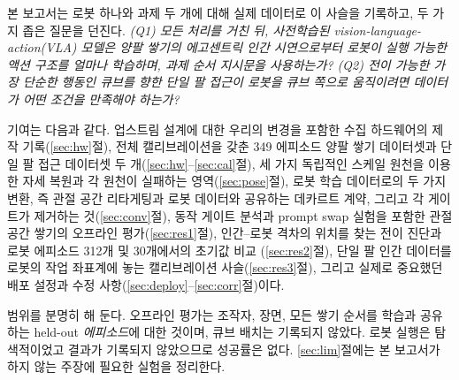 \documentclass[conference,10pt]{IEEEtran}
\begin{document}
본 보고서는 로봇 하나와 과제 두 개에 대해 실제 데이터로 이 사슬을 기록하고, 두 가지 좁은 질문을 던진다. \emph{(Q1) 모든 처리를
거친 뒤, 사전학습된 vision-language-action(VLA) 모델은 양팔 쌓기의 에고센트릭 인간 시연으로부터 로봇이 실행 가능한 액션 구조를 얼마나
학습하며, 과제 순서 지시문을 사용하는가? (Q2) 전이 가능한 가장 단순한 행동인 큐브를 향한 단일 팔 접근이 로봇을 큐브 쪽으로
움직이려면 데이터가 어떤 조건을 만족해야 하는가?}

기여는 다음과 같다. 업스트림 설계에 대한 우리의 변경을 포함한 수집 하드웨어의 제작 기록(\ref{sec:hw}절), 전체 캘리브레이션을 갖춘
349 에피소드 양팔 쌓기 데이터셋과 단일 팔 접근 데이터셋 두 개(\ref{sec:hw}--\ref{sec:cal}절), 세 가지 독립적인 스케일 원천을 이용한
자세 복원과 각 원천이 실패하는 영역(\ref{sec:pose}절), 로봇 학습 데이터로의 두 가지 변환, 즉 관절 공간 리타게팅과 로봇 데이터와
공유하는 데카르트 계약, 그리고 각 게이트가 제거하는 것(\ref{sec:conv}절), 동작 게이트 분석과 prompt swap 실험을 포함한 관절 공간 쌓기의
오프라인 평가(\ref{sec:res1}절), 인간--로봇 격차의 위치를 찾는 전이 진단과 로봇 에피소드 312개 및 30개에서의 초기값 비교
(\ref{sec:res2}절), 단일 팔 인간 데이터를 로봇의 작업 좌표계에 놓는 캘리브레이션 사슬(\ref{sec:res3}절), 그리고 실제로 중요했던 배포
설정과 수정 사항(\ref{sec:deploy}--\ref{sec:corr}절)이다.

범위를 분명히 해 둔다. 오프라인 평가는 조작자, 장면, 모든 쌓기 순서를 학습과 공유하는 held-out \emph{에피소드}에 대한 것이며, 큐브
배치는 기록되지 않았다. 로봇 실행은 탐색적이었고 결과가 기록되지 않았으므로 성공률은 없다. \ref{sec:lim}절에는 본 보고서가 하지 않는
주장에 필요한 실험을 정리한다.
\end{document}
